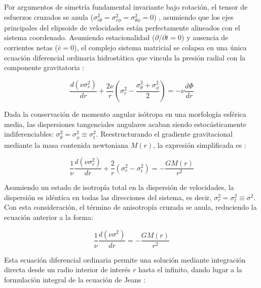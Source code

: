                     Por argumentos de simetría fundamental invariante bajo 
                    rotación, el tensor de esfuerzos cruzados se anula 
                    ($\sigma_{r\theta}^2 = \sigma_{r\phi}^2 = \sigma_{
                    \theta\phi}^2 = 0$) \cite{courteau2014galaxy}, asumiendo que 
                    los ejes principales del elipsoide de velocidades están 
                    perfectamente alineados con el sistema coordenado. Asumiendo 
                    estacionalidad ($\partial/\partial t = 0$) y ausencia de 
                    corrientes netas ($\bar{v} = 0$), el complejo sistema 
                    matricial se colapsa en una única ecuación diferencial 
                    ordinaria hidrostática que vincula la presión radial con la 
                    componente gravitatoria \cite{binney_tremaine_2008}: 

                    $$\frac{d(\nu \sigma_r^2)}{dr} + \frac{2\nu}{r}\left(
                    \sigma_r^2 - \frac{\sigma_\theta^2 + \sigma_\phi^2}{2} 
                    \right) = -\nu \frac{d\Phi}{dr}$$

                    Dada la conservación de momento angular isótropa en una 
                    morfología esférica media, las dispersiones tangenciales 
                    angulares acaban siendo estocásticamente indiferenciables: 
                    $\sigma_\theta^2 = \sigma_\phi^2 \equiv \sigma_t^2$. 
                    Reestructurando el gradiente gravitacional mediante la masa 
                    contenida newtoniana $M(r)$, la expresión simplificada es 
                    \cite{mamon2010kinematic}:

                    $$\frac{1}{\nu}\frac{d(\nu \sigma_r^2)}{dr} + \frac{2}{r}(
                    \sigma_r^2 - \sigma_t^2) = - \frac{GM(r)}{r^2}$$

                    Asumiendo un estado de isotropía total en la dispersión de 
                    velocidades, la dispersión es idéntica en todas las 
                    direcciones del sistema, es decir, $\sigma_r^2 = \sigma_t^2 
                    \equiv \sigma^2$. Con esta consideración, el término de 
                    anisotropía cruzada se anula, reduciendo la ecuación 
                    anterior a la forma:

                    $$\frac{1}{\nu} \frac{d(\nu \sigma^2)}{dr} = 
                    -\frac{GM(r)}{r^2}$$

                    Esta ecuación diferencial ordinaria permite una solución 
                    mediante integración directa desde un radio interior de 
                    interés $r$ hasta el infinito, dando lugar a la formulación 
                    integral de la ecuación de Jeans 
                    \cite{binney_tremaine_2008}:

